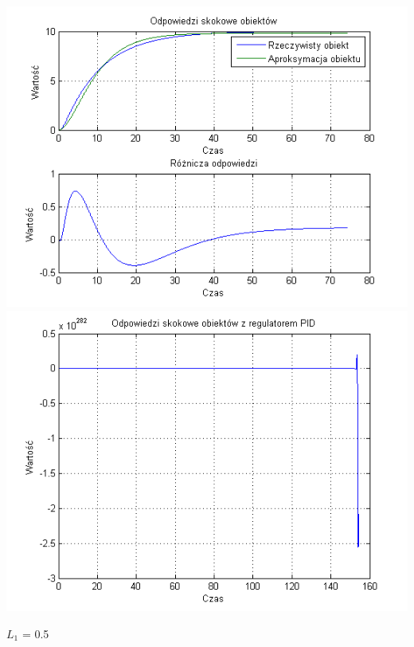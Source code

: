 \documentclass[10pt,a4paper]{article}
\begin{document}
\begin{center}
\includegraphics[scale=1]{images/dwa/skrypt_215.png}\\
\includegraphics[scale=1]{images/dwa/skrypt_216.png}\\
\end{center}
\newpage
$L_1$ = 0.5
\end{document}
